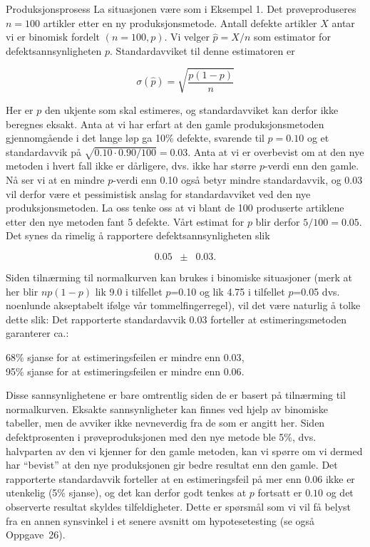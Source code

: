 \begin{eksempel}{Produksjonsprosess}
La situasjonen være som i Eksempel 1. Det prøveproduseres $n=100$
artikler etter en ny produksjonsmetode. Antall defekte artikler
$X$ antar vi er binomisk fordelt $(n=100,p)$. Vi velger $\hat{p}=X/n$ som
 estimator for defektsannsynligheten $p$.
Standardavviket til denne estimatoren er

\[  \sigma(\hat{p})=\sqrt{\frac{p(1-p)}{n}}   \]

\noindent Her er $p$ den ukjente som skal estimeres, og standardavviket kan
derfor ikke beregnes eksakt. Anta at vi har erfart at den gamle
produksjonsmetoden gjennomgående i det lange løp ga 10\% defekte,
svarende til $p=0.10$ og et standardavvik på
 $\sqrt{0.10 \cdot 0.90/100}=0.03 $.
Anta at vi er overbevist om at den nye metoden i hvert fall ikke
er dårligere, dvs. ikke har større $p$-verdi enn den gamle. Nå
ser vi at en mindre $p$-verdi enn 0.10 også betyr mindre
standardavvik, og 0.03 vil derfor være et pessimistisk anslag
for standardavviket ved den nye produksjons\-metoden. La oss tenke
oss at vi blant de 100 produserte artiklene etter den nye metoden
fant 5 defekte. Vårt estimat for $p$ blir derfor $5/100=0.05$.
Det synes da rimelig å rapportere defektsannsynligheten slik

\[     0.05 \; \; \pm \; \; 0.03. \]

\noindent Siden tilnærming til normalkurven kan brukes i
binomiske situa\-sjoner (merk at her blir $np(1-p)$ lik 9.0 i
tilfellet $p$=0.10 og lik 4.75 i tilfellet $p$=0.05 dvs.
noenlunde akseptabelt ifølge vår tommelfingerregel), vil det være
naturlig å tolke dette slik: Det rapporterte standardavvik 0.03
forteller at estimeringsmetoden garanterer ca.:
\begin{center}
     68\% sjanse for at estimeringsfeilen er mindre enn $0.03$,\\
     95\% sjanse for at estimeringsfeilen er mindre enn $0.06$.
\end{center}
\noindent Disse sannsynlighetene er bare omtrentlig siden de er basert på
tilnærming til normalkurven. Eksakte sannsynligheter kan finnes
ved hjelp av binomiske tabeller, men de avviker ikke nevneverdig fra de
som er angitt her. Siden defektprosenten i prøveproduksjonen med
den nye metode ble 5\%, dvs. halvparten av den vi kjenner for den
gamle metoden, kan vi spørre om vi dermed har ``bevist'' at den
nye produksjonen gir bedre resultat enn den gamle. Det
rapporterte standardavvik forteller at en estimeringsfeil på mer
enn $0.06$ ikke er utenkelig (5\% sjanse), og det kan derfor godt
tenkes at $p$ fortsatt er $0.10$ og det observerte resultat
skyldes tilfeldigheter. Dette er spørsmål som vi vil få belyst
fra en annen synsvinkel i et senere avsnitt om hypotesetesting
(se også Oppgave~26).


\end{eksempel}
